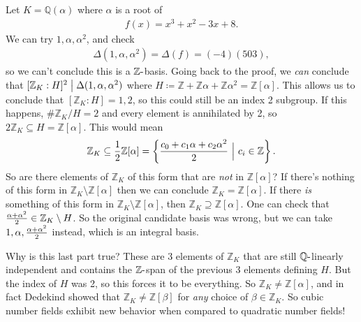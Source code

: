 \begin{example}

Let \(K = {\mathbb{Q}}( \alpha)\) where \(\alpha\) is a root of
\begin{align*}
f(x) = x^3 + x^2 - 3x + 8
.\end{align*}
We can try \(1, \alpha, \alpha^2\), and check
\begin{align*}
{\Delta}(1, \alpha, \alpha^2) = {\Delta}(f) = (-4)(503)
,\end{align*}
so we can't conclude this is a \({\mathbb{Z}}{\hbox{-}}\)basis. Going
back to the proof, we \emph{can} conclude that
\([{\mathbb{Z}}_K: H] ^2 \bigm|{\Delta}(1, \alpha, \alpha^2)\) where
\(H \coloneqq{\mathbb{Z}}+ {\mathbb{Z}}\alpha + {\mathbb{Z}}\alpha^2 = {\mathbb{Z}}[ \alpha ]\).
This allows us to conclude that \([{\mathbb{Z}}_K: H] = 1, 2\), so this
could still be an index 2 subgroup. If this happens,
\(\# {\mathbb{Z}}_K/H = 2\) and every element is annihilated by 2, so
\(2{\mathbb{Z}}_K \subseteq H = {\mathbb{Z}}[ \alpha ]\). This would
mean
\begin{align*}
{\mathbb{Z}}_K \subseteq {1\over 2} {\mathbb{Z}}[ \alpha ] 
= 
\left\{{ {c_0 + c_1 \alpha + c_2 \alpha^2 \over 2} {~\mathrel{\Big|}~}c_i \in {\mathbb{Z}}}\right\} 
.\end{align*}
So are there elements of \({\mathbb{Z}}_K\) of this form that are
\emph{not} in \({\mathbb{Z}}[ \alpha ]\)? If there's nothing of this
form in \({\mathbb{Z}}_K \setminus{\mathbb{Z}}[ \alpha ]\) then we can
conclude \({\mathbb{Z}}_K = {\mathbb{Z}}[ \alpha ]\). If there \emph{is}
something of this form in
\({\mathbb{Z}}_K \setminus{\mathbb{Z}}[ \alpha ]\), then
\({\mathbb{Z}}_K \supseteq {\mathbb{Z}}[\alpha]\). One can check that
\({\alpha+ \alpha^2 \over 2} \in {\mathbb{Z}}_K \setminus H\). So the
original candidate basis was wrong, but we can take
\(1, \alpha, {\alpha + \alpha^2 \over 2}\) instead, which is an integral
basis.

\end{example}

\begin{remark}

Why is this last part true? These are 3 elements of \({\mathbb{Z}}_K\)
that are still \({\mathbb{Q}}{\hbox{-}}\)linearly independent and
contains the \({\mathbb{Z}}{\hbox{-}}\)span of the previous 3 elements
defining \(H\). But the index of \(H\) was 2, so this forces it to be
everything. So \({\mathbb{Z}}_K \neq {\mathbb{Z}}[ \alpha]\), and in
fact Dedekind showed that \({\mathbb{Z}}_K \neq {\mathbb{Z}}[ \beta]\)
for \emph{any} choice of \(\beta\in {\mathbb{Z}}_K\). So cubic number
fields exhibit new behavior when compared to quadratic number fields!

\end{remark}

